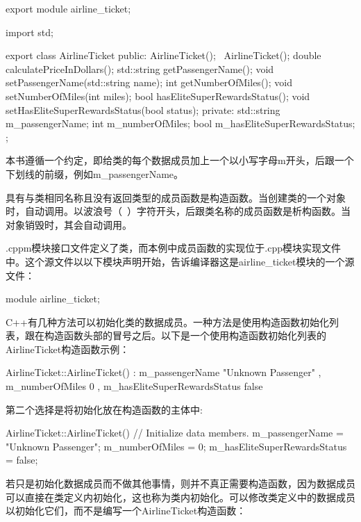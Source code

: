 \begin{cpp}
export module airline_ticket;

import std;

export class AirlineTicket
{
    public:
        AirlineTicket();
        ~AirlineTicket();
        double calculatePriceInDollars();
        std::string getPassengerName();
        void setPassengerName(std::string name);
        int getNumberOfMiles();
        void setNumberOfMiles(int miles);
        bool hasEliteSuperRewardsStatus();
        void setHasEliteSuperRewardsStatus(bool status);
    private:
        std::string m_passengerName;
        int m_numberOfMiles;
        bool m_hasEliteSuperRewardsStatus;
};
\end{cpp}

本书遵循一个约定，即给类的每个数据成员加上一个以小写字母m开头，后跟一个下划线的前缀，例如m\_passengerName。

具有与类相同名称且没有返回类型的成员函数是构造函数。当创建类的一个对象时，自动调用。以波浪号（~）字符开头，后跟类名称的成员函数是析构函数。当对象销毁时，其会自动调用。

.cppm模块接口文件定义了类，而本例中成员函数的实现位于.cpp模块实现文件中。这个源文件以以下模块声明开始，告诉编译器这是airline\_ticket模块的一个源文件：

\begin{cpp}
module airline_ticket;
\end{cpp}

C++有几种方法可以初始化类的数据成员。一种方法是使用构造函数初始化列表，跟在构造函数头部的冒号之后。以下是一个使用构造函数初始化列表的AirlineTicket构造函数示例：

\begin{cpp}
AirlineTicket::AirlineTicket()
    : m_passengerName { "Unknown Passenger" }
    , m_numberOfMiles { 0 }
    , m_hasEliteSuperRewardsStatus { false }
{}
\end{cpp}

第二个选择是将初始化放在构造函数的主体中:

\begin{cpp}
AirlineTicket::AirlineTicket()
{
    // Initialize data members.
    m_passengerName = "Unknown Passenger";
    m_numberOfMiles = 0;
    m_hasEliteSuperRewardsStatus = false;
}
\end{cpp}

若只是初始化数据成员而不做其他事情，则并不真正需要构造函数，因为数据成员可以直接在类定义内初始化，这也称为类内初始化。可以修改类定义中的数据成员以初始化它们，而不是编写一个AirlineTicket构造函数：

